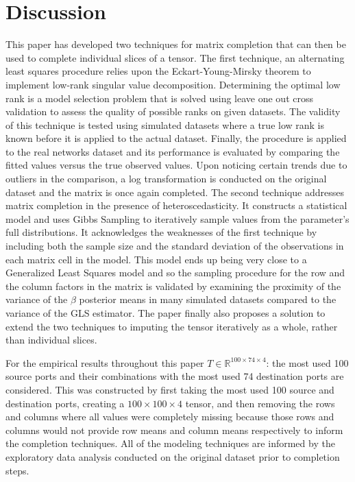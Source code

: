 \documentclass[12pt,twoside]{dukestatscithesis}
\theoremstyle{definition}
\theoremstyle{definition}
\theoremstyle{definition}
\theoremstyle{remark}
\begin{document}
\chapter*{Discussion}\label{discussion}

This paper has developed two techniques for matrix completion that can
then be used to complete individual slices of a tensor. The first
technique, an alternating least squares procedure relies upon the
Eckart-Young-Mirsky theorem to implement low-rank singular value
decomposition. Determining the optimal low rank is a model selection
problem that is solved using leave one out cross validation to assess
the quality of possible ranks on given datasets. The validity of this
technique is tested using simulated datasets where a true low rank is
known before it is applied to the actual dataset. Finally, the procedure
is applied to the real networks dataset and its performance is evaluated
by comparing the fitted values versus the true observed values. Upon
noticing certain trends due to outliers in the comparison, a log
transformation is conducted on the original dataset and the matrix is
once again completed. The second technique addresses matrix completion
in the presence of heteroscedasticity. It constructs a statistical model
and uses Gibbs Sampling to iteratively sample values from the
parameter's full distributions. It acknowledges the weaknesses of the
first technique by including both the sample size and the standard
deviation of the observations in each matrix cell in the model. This
model ends up being very close to a Generalized Least Squares model and
so the sampling procedure for the row and the column factors in the
matrix is validated by examining the proximity of the variance of the
\(\beta\) posterior means in many simulated datasets compared to the
variance of the GLS estimator. The paper finally also proposes a
solution to extend the two techniques to imputing the tensor iteratively
as a whole, rather than individual slices.

For the empirical results throughout this paper
\(T \in \mathbb{R}^{100 \times 74 \times 4}\): the most used 100 source
ports and their combinations with the most used 74 destination ports are
considered. This was constructed by first taking the most used 100
source and destination ports, creating a \(100 \times 100 \times 4\)
tensor, and then removing the rows and columns where all values were
completely missing because those rows and columns would not provide row
means and column means respectively to inform the completion techniques.
All of the modeling techniques are informed by the exploratory data
analysis conducted on the original dataset prior to completion steps.
\end{document}
